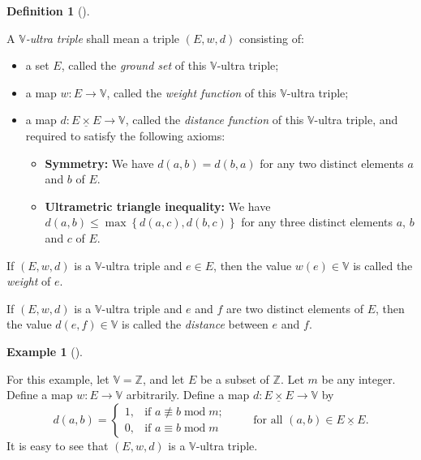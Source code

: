 \documentclass[numbers=enddot,12pt,final,onecolumn,notitlepage]{scrartcl}%
\theoremstyle{definition}
\newtheorem{defi}[theo]{Definition}
\newenvironment{definition}[1][]
{\begin{defi}[#1]\begin{leftbar}}
{\end{leftbar}\end{defi}}
\newtheorem{exam}[theo]{Example}
\newenvironment{example}[1][]
{\begin{exam}[#1]\begin{leftbar}}
{\end{leftbar}\end{exam}}
\newcommand{\timesu}{\mathbin{\underline{\times}}}
\renewcommand{\leq}{\leqslant}
\theoremstyle{plainsl}
\begin{document}
\begin{definition}
\label{def.Vultra}A $\mathbb{V}$\textit{-ultra triple} shall mean a triple
$\left(  E,w,d\right)  $ consisting of:

\begin{itemize}
\item a set $E$, called the \textit{ground set} of this $\mathbb{V}$-ultra triple;

\item a map $w:E\rightarrow\mathbb{V}$, called the \textit{weight function} of
this $\mathbb{V}$-ultra triple;

\item a map $d:E\timesu E\rightarrow\mathbb{V}$, called the \textit{distance
function} of this $\mathbb{V}$-ultra triple, and required to satisfy the
following axioms:

\begin{itemize}
\item \textbf{Symmetry:} We have $d\left(  a,b\right)  =d\left(  b,a\right)  $
for any two distinct elements $a$ and $b$ of $E$.

\item \textbf{Ultrametric triangle inequality:} We have $d\left(  a,b\right)
\leq\max\left\{  d\left(  a,c\right)  ,d\left(  b,c\right)  \right\}  $ for
any three distinct elements $a$, $b$ and $c$ of $E$.
\end{itemize}
\end{itemize}

If $\left(  E,w,d\right)  $ is a $\mathbb{V}$-ultra triple and $e\in E$, then
the value $w\left(  e\right)  \in\mathbb{V}$ is called the \textit{weight} of
$e$.

If $\left(  E,w,d\right)  $ is a $\mathbb{V}$-ultra triple and $e$ and $f$ are
two distinct elements of $E$, then the value $d\left(  e,f\right)
\in\mathbb{V}$ is called the \textit{distance} between $e$ and $f$.
\end{definition}

\begin{example}
\label{exa.Vultra.a=bmodm}For this example, let $\mathbb{V}=\mathbb{Z}$, and
let $E$ be a subset of $\mathbb{Z}$. Let $m$ be any integer. Define a map
$w:E\rightarrow\mathbb{V}$ arbitrarily. Define a map $d:E\timesu
E\rightarrow\mathbb{V}$ by%
\[
d\left(  a,b\right)  =%
\begin{cases}
1, & \text{if }a\not \equiv b\operatorname{mod}m;\\
0, & \text{if }a\equiv b\operatorname{mod}m
\end{cases}
\ \ \ \ \ \ \ \ \ \ \text{for all }\left(  a,b\right)  \in E\timesu E.
\]
It is easy to see that $\left(  E,w,d\right)  $ is a $\mathbb{V}$-ultra triple.
\end{example}
\end{document}
